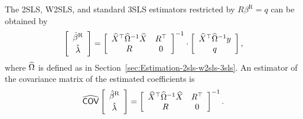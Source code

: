 The 2SLS, W2SLS, and standard 3SLS estimators
restricted by $R \beta^\text{R} = q$ can be obtained by
\begin{equation}
   \left[ \begin{array}{c}
      \hat{\beta}^\text{R} \\[0.2em] \hat{\lambda}
   \end{array} \right]
   =
   \left[ \begin{array}{cc}
      \widehat{X}^\top \widehat{\Omega}^{-1} \widehat{X} & R^\top \\
      R & 0
   \end{array} \right]^{-1}
   \cdot
   \left[ \begin{array}{c}
      \widehat{X}^\top \widehat{\Omega}^{-1} y \\ q
   \end{array} \right] ,
   \label{eq:2sls-w2sls-3sls-r}
\end{equation}
where $\widehat{\Omega}$ is defined as in Section~\ref{sec:Estimation-2sls-w2sls-3sls}.
An estimator of the covariance matrix of the estimated coefficients is
\begin{equation}
   \widehat{\mathsf{COV}}
   \left[ \begin{array}{c}
      \hat{\beta}^\text{R} \\[0.2em] \hat{\lambda}
   \end{array} \right] 
   = 
   \left[ \begin{array}{cc}
      \widehat{X}^\top \widehat{\Omega}^{-1} \widehat{X} & R^\top \\
      R & 0
   \end{array} \right]^{-1} .
   \label{eq:cov-2sls-w2sls-3sls-r}
\end{equation}

